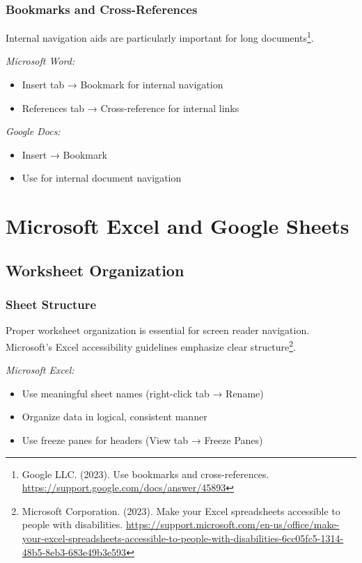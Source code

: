 \subsubsection{Bookmarks and Cross-References}
Internal navigation aids are particularly important for long documents\footnote{Google LLC. (2023). Use bookmarks and cross-references. \url{https://support.google.com/docs/answer/45893}}.

\emph{Microsoft Word:}
\begin{itemize}
\item Insert tab → Bookmark for internal navigation
\item References tab → Cross-reference for internal links
\end{itemize}

\emph{Google Docs:}
\begin{itemize}
\item Insert → Bookmark
\item Use for internal document navigation
\end{itemize}

\section{Microsoft Excel and Google Sheets}
\label{sec:excel-google-sheets}

\subsection{Worksheet Organization}

\subsubsection{Sheet Structure}
Proper worksheet organization is essential for screen reader navigation. Microsoft's Excel accessibility guidelines emphasize clear structure\footnote{Microsoft Corporation. (2023). Make your Excel spreadsheets accessible to people with disabilities. \url{https://support.microsoft.com/en-us/office/make-your-excel-spreadsheets-accessible-to-people-with-disabilities-6cc05fc5-1314-48b5-8eb3-683e49b3e593}}.

\emph{Microsoft Excel:}
\begin{itemize}
\item Use meaningful sheet names (right-click tab → Rename)
\item Organize data in logical, consistent manner
\item Use freeze panes for headers (View tab → Freeze Panes)
\end{itemize}

